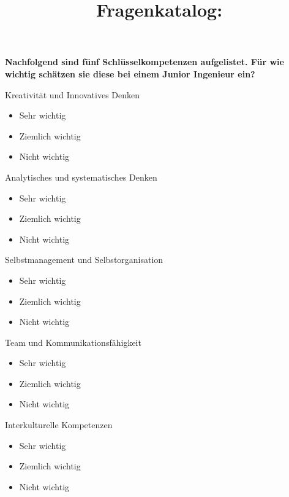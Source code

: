 \documentclass{article}
\title{Fragenkatalog:}
\date{}             %
\begin{document}
 

\maketitle

\textbf{Nachfolgend sind fünf Schlüsselkompetenzen aufgelistet. Für wie wichtig schätzen sie diese bei einem Junior Ingenieur ein?}

\addvspace{18mm}

Kreativität und Innovatives Denken 

\begin{itemize}[label={\Square}] 
\item Sehr wichtig
\item Ziemlich wichtig
\item Nicht wichtig
\end{itemize} 
\bigskip 

Analytisches und systematisches Denken

\begin{itemize}[label={\Square}] 
\item Sehr wichtig
\item Ziemlich wichtig
\item Nicht wichtig
\end{itemize} 
\bigskip 

Selbstmanagement und Selbstorganisation

\begin{itemize}[label={\Square}] 
\item Sehr wichtig
\item Ziemlich wichtig
\item Nicht wichtig
\end{itemize} 
\bigskip 

Team und Kommunikationsfähigkeit

\begin{itemize}[label={\Square}] 
\item Sehr wichtig
\item Ziemlich wichtig
\item Nicht wichtig
\end{itemize} 
\bigskip 

Interkulturelle Kompetenzen

\begin{itemize}[label={\Square}] 
\item Sehr wichtig
\item Ziemlich wichtig
\item Nicht wichtig
\end{itemize} 
\bigskip 
\end{document}

